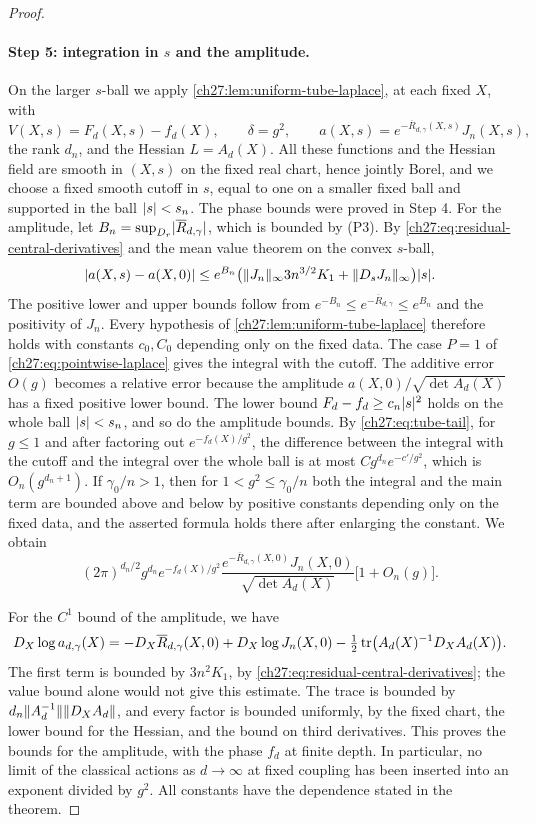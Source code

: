 \begin{proof}
\paragraph{Step 5: integration in $s$ and the amplitude.}
On the larger $s$-ball we apply \cref{ch27:lem:uniform-tube-laplace}, at each fixed $X$, with
\[
 V(X,s)=F_d(X,s)-f_d(X),\qquad\delta=g^2,\qquad a(X,s)=e^{-\overline R_{d,\gamma}(X,s)}J_n(X,s),
\]
the rank $d_n$, and the Hessian $L=A_d(X)$. All these functions and the Hessian field are smooth in $(X,s)$ on the fixed real chart, hence jointly Borel, and we choose a fixed smooth cutoff in $s$, equal to one on a smaller fixed ball and supported in the ball $\lvert s\rvert<s_n$. The phase bounds were proved in Step 4. For the amplitude, let $B_n=\sup_{D_r}\lvert \overline R_{d,\gamma}\rvert$, which is bounded by (P3). By \eqref{ch27:eq:residual-central-derivatives} and the mean value theorem on the convex $s$-ball,
\[
 \lvert a(X,s)-a(X,0)\rvert\le e^{B_n}\bigl(\lVert J_n\rVert_\infty3n^{3/2}K_1+\lVert D_sJ_n\rVert_\infty\bigr)\lvert s\rvert.
\]
The positive lower and upper bounds follow from $e^{-B_n}\le e^{-\overline R_{d,\gamma}}\le e^{B_n}$ and the positivity of $J_n$. Every hypothesis of \cref{ch27:lem:uniform-tube-laplace} therefore holds with constants $c_0,C_0$ depending only on the fixed data. The case $P=1$ of \eqref{ch27:eq:pointwise-laplace} gives the integral with the cutoff. The additive error $O(g)$ becomes a relative error because the amplitude $a(X,0)/\sqrt{\det A_d(X)}$ has a fixed positive lower bound. The lower bound $F_d-f_d\ge c_n\lvert s\rvert^2$ holds on the whole ball $\lvert s\rvert<s_n$, and so do the amplitude bounds. By \eqref{ch27:eq:tube-tail}, for $g\le1$ and after factoring out $e^{-f_d(X)/g^2}$, the difference between the integral with the cutoff and the integral over the whole ball is at most $Cg^{d_n}e^{-c'/g^2}$, which is $O_n(g^{d_n+1})$. If $\gamma_0/n>1$, then for $1<g^2\le\gamma_0/n$ both the integral and the main term are bounded above and below by positive constants depending only on the fixed data, and the asserted formula holds there after enlarging the constant. We obtain
\[
 (2\pi)^{d_n/2}g^{d_n}e^{-f_d(X)/g^2}\frac{e^{-\overline R_{d,\gamma}(X,0)}J_n(X,0)}{\sqrt{\det A_d(X)}}\bigl[1+O_n(g)\bigr].
\]

For the $C^1$ bound of the amplitude, we have
\[
 D_X\log a_{d,\gamma}(X)=-D_X\overline R_{d,\gamma}(X,0)+D_X\log J_n(X,0)-\tfrac12\operatorname{tr}\bigl(A_d(X)^{-1}D_XA_d(X)\bigr).
\]
The first term is bounded by $3n^2K_1$, by \eqref{ch27:eq:residual-central-derivatives}; the value bound alone would not give this estimate. The trace is bounded by $d_n\lVert A_d^{-1}\rVert\lVert D_XA_d\rVert$, and every factor is bounded uniformly, by the fixed chart, the lower bound for the Hessian, and the bound on third derivatives. This proves the bounds for the amplitude, with the phase $f_d$ at finite depth. In particular, no limit of the classical actions as $d\to\infty$ at fixed coupling has been inserted into an exponent divided by $g^2$. All constants have the dependence stated in the theorem.
\end{proof}

